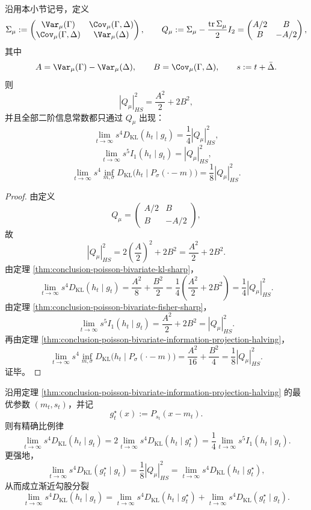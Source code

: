 \begin{theorem}\label{thm:conclusion-poisson-cauchy-traceless-quadrupole-factorization}
沿用本小节记号，定义
\[
\Sigma_\mu:=
\begin{pmatrix}
\Var_\mu(\Gamma) & \Cov_\mu(\Gamma,\Delta)\\
\Cov_\mu(\Gamma,\Delta) & \Var_\mu(\Delta)
\end{pmatrix},
\qquad
Q_\mu:=\Sigma_\mu-\frac{\operatorname{tr}\Sigma_\mu}{2}I_2
=
\begin{pmatrix}
A/2 & B\\
B & -A/2
\end{pmatrix},
\]
其中
\[
A=\Var_\mu(\Gamma)-\Var_\mu(\Delta),
\qquad
B=\Cov_\mu(\Gamma,\Delta),
\qquad
s:=t+\bar\Delta.
\]
则
\[
|Q_\mu|_{HS}^2=\frac{A^2}{2}+2B^2,
\]
并且全部二阶信息常数都只通过 \(Q_\mu\) 出现：
\[
\lim_{t\to\infty}s^4D_{\mathrm{KL}}(h_t\mid g_t)=\frac14|Q_\mu|_{HS}^2,
\]
\[
\lim_{t\to\infty}s^5I_1(h_t\mid g_t)=|Q_\mu|_{HS}^2,
\]
\[
\lim_{t\to\infty}s^4\inf_{m,\sigma}D_{\mathrm{KL}}\!\bigl(h_t\mid P_\sigma(\cdot-m)\bigr)=\frac18|Q_\mu|_{HS}^2.
\]
\end{theorem}

\begin{proof}
由定义
\[
Q_\mu=
\begin{pmatrix}
A/2 & B\\
B & -A/2
\end{pmatrix},
\]
故
\[
|Q_\mu|_{HS}^2
=
2\left(\frac{A}{2}\right)^2+2B^2
=
\frac{A^2}{2}+2B^2.
\]
由定理 \ref{thm:conclusion-poisson-bivariate-kl-sharp}，
\[
\lim_{t\to\infty}s^4D_{\mathrm{KL}}(h_t\mid g_t)
=
\frac{A^2}{8}+\frac{B^2}{2}
=
\frac14\left(\frac{A^2}{2}+2B^2\right)
=
\frac14|Q_\mu|_{HS}^2.
\]
由定理 \ref{thm:conclusion-poisson-bivariate-fisher-sharp}，
\[
\lim_{t\to\infty}s^5I_1(h_t\mid g_t)
=
\frac{A^2}{2}+2B^2
=
|Q_\mu|_{HS}^2.
\]
再由定理 \ref{thm:conclusion-poisson-bivariate-information-projection-halving}，
\[
\lim_{t\to\infty}s^4\inf_{m,\sigma}D_{\mathrm{KL}}\!\bigl(h_t\mid P_\sigma(\cdot-m)\bigr)
=
\frac{A^2}{16}+\frac{B^2}{4}
=
\frac18|Q_\mu|_{HS}^2.
\]
证毕。
\end{proof}

\begin{corollary}\label{cor:conclusion-poisson-cauchy-exact-124-pythagoras}
沿用定理 \ref{thm:conclusion-poisson-bivariate-information-projection-halving} 的最优参数 \((m_t,s_t)\)，并记
\[
g_t^\star(x):=P_{s_t}(x-m_t).
\]
则有精确比例律
\[
\lim_{t\to\infty}s^4D_{\mathrm{KL}}(h_t\mid g_t)
=
2\lim_{t\to\infty}s^4D_{\mathrm{KL}}(h_t\mid g_t^\star)
=
\frac14\lim_{t\to\infty}s^5I_1(h_t\mid g_t).
\]
更强地，
\[
\lim_{t\to\infty}s^4D_{\mathrm{KL}}(g_t^\star\mid g_t)
=
\frac18|Q_\mu|_{HS}^2
=
\lim_{t\to\infty}s^4D_{\mathrm{KL}}(h_t\mid g_t^\star),
\]
从而成立渐近勾股分裂
\[
\lim_{t\to\infty}s^4D_{\mathrm{KL}}(h_t\mid g_t)
=
\lim_{t\to\infty}s^4D_{\mathrm{KL}}(h_t\mid g_t^\star)
+
\lim_{t\to\infty}s^4D_{\mathrm{KL}}(g_t^\star\mid g_t).
\]
\end{corollary}

